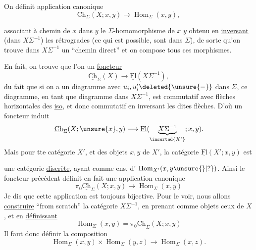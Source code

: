 On définit  application canonique
\[
\mathrm{Ch}_\Sigma(X;x,y)\longrightarrow\operatorname{Hom}_\Sigma(x,y),
\]

 associant à  chemin de $x$ dans $y$ le $\Sigma$-homomorphisme de $x$  $y$ obtenu en \uline{inversant}  (dans $X\Sigma^{-1}$) les   rétrogrades (ce qui est possible,  sont dans $\Sigma$), de sorte qu'on trouve dans $X\Sigma^{-1}$ un ``chemin direct''
et on compose tous ces morphismes.

En fait, on trouve  que  l'on   un \uline{foncteur}
\[
\underline{\mathrm{Ch}}_\Sigma(X)\longrightarrow\underline{\mathrm{Fl}}(X\Sigma^{-1}),
\]
du fait que si on a un diagramme
avec $u_i,u'_i\deleted{\unsure{-}}$ dans $\Sigma$, ce diagramme, en tant que diagramme dans $X\Sigma^{-1}$, est commutatif avec flèches horizontales des \uline{iso}, et  donc commutatif en inversant les dites flèches. D'où un foncteur induit
\[
\underline{\mathrm{Ch}}_\Sigma(X;\unsure{x},y)\longrightarrow\underline{\mathrm{Fl}}(\underset{\inserted{X'}}{\underbrace{X\Sigma^{-1}}};x,y).
\]
Mais  pour tte catégorie $X'$, et des objets $x,y$ de $X'$, la catégorie $\underline{\mathrm{Fl}}(X';x,y)$ est

une catégorie \uline{discrète}, ayant comme ens. d' $\operatorname{Hom}_{X'}(x,y\unsure{\}|?})$. Ainsi le foncteur précédent définit en fait une application canonique
\[
\boxed{\pi_0\underline{\mathrm{Ch}}_\Sigma(X;x,y)\longrightarrow\operatorname{Hom}_\Sigma(x,y)}
\]
Je dis que cette application est toujours bijective. Pour le voir, nous allons \uline{construire} ``from scratch'' la catégorie $X\Sigma^{-1}$, en prenant comme objets ceux de $X$, et  en \uline{définissant}
\[
\boxed{\operatorname{Hom}_\Sigma(x,y)=\pi_0\underline{\mathrm{Ch}}_\Sigma(X;x,y)}
\]
Il faut donc définir la composition
\[
\operatorname{Hom}_\Sigma(x,y)\times\operatorname{Hom}_\Sigma(y,z)\longrightarrow\operatorname{Hom}_\Sigma(x,z).
\]

